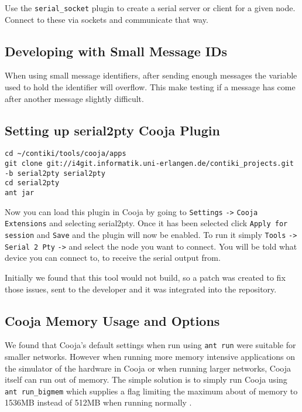 Use the \verb|serial_socket| plugin to create a serial server or client for a given node. Connect to these via sockets and communicate that way.

\subsection{Developing with Small Message IDs}

When using small message identifiers, after sending enough messages the variable used to hold the identifier will overflow. This make testing if a message has come after another message slightly difficult.

\subsection{Setting up serial2pty Cooja Plugin}

\begin{listing}[H]
\begin{verbatim}
cd ~/contiki/tools/cooja/apps
git clone git://i4git.informatik.uni-erlangen.de/contiki_projects.git -b serial2pty serial2pty
cd serial2pty
ant jar
\end{verbatim}
\end{listing}

Now you can load this plugin in Cooja by going to \verb|Settings| \verb|->| \verb|Cooja Extensions| and selecting serial2pty. Once it has been selected click \verb|Apply for session| and \verb|Save| and the plugin will now be enabled. To run it simply \verb|Tools| \verb|->| \verb| Serial 2 Pty| \verb|->| and select the node you want to connect. You will be told what device you can connect to, to receive the serial output from.

Initially we found that this tool would not build, so a patch was created to fix those issues, sent to the developer and it was integrated into the repository.

\subsection{Cooja Memory Usage  and Options}

We found that Cooja's default settings when run using \verb|ant run| were suitable for smaller networks. However when running more memory intensive applications on the simulator of the hardware in Cooja or when running larger networks, Cooja itself can run out of memory. The simple solution is to simply run Cooja using \verb|ant run_bigmem| which supplies a flag limiting the maximum about of memory to 1536MB instead of 512MB when running normally \cite{?}.

